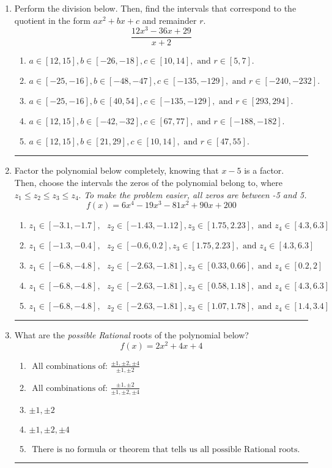 \documentclass[14pt]{extbook}
\newcommand{\litem}[1]{\item#1\hspace*{-1cm}\rule{\textwidth}{0.4pt}}
\begin{document}
\begin{enumerate}
{\begin{enumerate}[label=\Alph*.]
\end{enumerate} }
\litem{
Perform the division below. Then, find the intervals that correspond to the quotient in the form $ax^2+bx+c$ and remainder $r$.\[ \frac{12x^{3} -36 x + 29}{x + 2} \]\begin{enumerate}[label=\Alph*.]
\item \( a \in [12, 15], b \in [-26, -18], c \in [10, 14], \text{ and } r \in [5, 7]. \)
\item \( a \in [-25, -16], b \in [-48, -47], c \in [-135, -129], \text{ and } r \in [-240, -232]. \)
\item \( a \in [-25, -16], b \in [40, 54], c \in [-135, -129], \text{ and } r \in [293, 294]. \)
\item \( a \in [12, 15], b \in [-42, -32], c \in [67, 77], \text{ and } r \in [-188, -182]. \)
\item \( a \in [12, 15], b \in [21, 29], c \in [10, 14], \text{ and } r \in [47, 55]. \)

\end{enumerate} }
\litem{
Factor the polynomial below completely, knowing that $x -5$ is a factor. Then, choose the intervals the zeros of the polynomial belong to, where $z_1 \leq z_2 \leq z_3 \leq z_4$. \textit{To make the problem easier, all zeros are between -5 and 5.}\[ f(x) = 6x^{4} -19 x^{3} -81 x^{2} +90 x + 200 \]\begin{enumerate}[label=\Alph*.]
\item \( z_1 \in [-3.1, -1.7], \text{   }  z_2 \in [-1.43, -1.12], z_3 \in [1.75, 2.23], \text{   and   } z_4 \in [4.3, 6.3] \)
\item \( z_1 \in [-1.3, -0.4], \text{   }  z_2 \in [-0.6, 0.2], z_3 \in [1.75, 2.23], \text{   and   } z_4 \in [4.3, 6.3] \)
\item \( z_1 \in [-6.8, -4.8], \text{   }  z_2 \in [-2.63, -1.81], z_3 \in [0.33, 0.66], \text{   and   } z_4 \in [0.2, 2] \)
\item \( z_1 \in [-6.8, -4.8], \text{   }  z_2 \in [-2.63, -1.81], z_3 \in [0.58, 1.18], \text{   and   } z_4 \in [4.3, 6.3] \)
\item \( z_1 \in [-6.8, -4.8], \text{   }  z_2 \in [-2.63, -1.81], z_3 \in [1.07, 1.78], \text{   and   } z_4 \in [1.4, 3.4] \)

\end{enumerate} }
\litem{
What are the \textit{possible Rational} roots of the polynomial below?\[ f(x) = 2x^{2} +4 x + 4 \]\begin{enumerate}[label=\Alph*.]
\item \( \text{ All combinations of: }\frac{\pm 1,\pm 2,\pm 4}{\pm 1,\pm 2} \)
\item \( \text{ All combinations of: }\frac{\pm 1,\pm 2}{\pm 1,\pm 2,\pm 4} \)
\item \( \pm 1,\pm 2 \)
\item \( \pm 1,\pm 2,\pm 4 \)
\item \( \text{ There is no formula or theorem that tells us all possible Rational roots.} \)


\end{enumerate}}
\end{enumerate}
\end{document}
